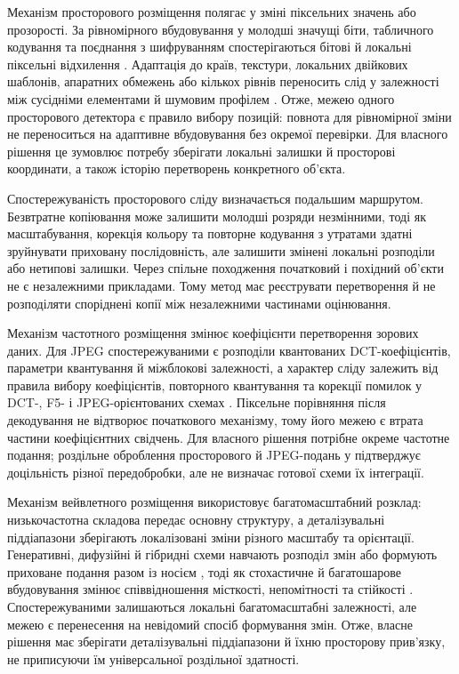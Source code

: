Механізм просторового розміщення полягає у зміні піксельних значень або прозорості. За рівномірного вбудовування у молодші значущі біти, табличного кодування та поєднання з шифруванням спостерігаються бітові й локальні піксельні відхилення \cite{panigrahi2025lsb,hapsari2023lsb,huang2025hybridcoding,ali2024videolsb,sakshi2022lsb,alanzy2023lsb}. Адаптація до країв, текстури, локальних двійкових шаблонів, апаратних обмежень або кількох рівнів переносить слід у залежності між сусідніми елементами й шумовим профілем \cite{hassaballah2021iiot,sultana2023edge,hameed2024medical,harb2023hardware,abuali2024multilevel,wozniak2025twophase,alexan2024stegocrypt}. Отже, межею одного просторового детектора є правило вибору позицій: повнота для рівномірної зміни не переноситься на адаптивне вбудовування без окремої перевірки. Для власного рішення це зумовлює потребу зберігати локальні залишки й просторові координати, а також історію перетворень конкретного об’єкта.

Спостережуваність просторового сліду визначається подальшим маршрутом. Безвтратне копіювання може залишити молодші розряди незмінними, тоді як масштабування, корекція кольору та повторне кодування з утратами здатні зруйнувати приховану послідовність, але залишити змінені локальні розподіли або нетипові залишки. Через спільне походження початковий і похідний об’єкти не є незалежними прикладами. Тому метод має реєструвати перетворення й не розподіляти споріднені копії між незалежними частинами оцінювання.

Механізм частотного розміщення змінює коефіцієнти перетворення зорових даних. Для JPEG спостережуваними є розподіли квантованих DCT-коефіцієнтів, параметри квантування й міжблокові залежності, а характер сліду залежить від правила вибору коефіцієнтів, повторного квантування та корекції помилок у DCT-, F5- і JPEG-орієнтованих схемах \cite{parsafar2024qft,maurya2023quantumdct,wang2023hyperchaotic,pan2022hiddenbit,sushil2024f5,chen2024f5robustness,duan2023jpeg,pan2024jpeg}. Піксельне порівняння після декодування не відтворює початкового механізму, тому його межею є втрата частини коефіцієнтних свідчень. Для власного рішення потрібне окреме частотне подання; роздільне оброблення просторового й JPEG-подань у \cite{he2025twobranch} підтверджує доцільність різної передобробки, але не визначає готової схеми їх інтеграції.

Механізм вейвлетного розміщення використовує багатомасштабний розклад: низькочастотна складова передає основну структуру, а деталізувальні піддіапазони зберігають локалізовані зміни різного масштабу та орієнтації. Генеративні, дифузійні й гібридні схеми навчають розподіл змін або формують приховане подання разом із носієм \cite{yao2024ganwavelet,yuan2022gansecurity,peng2023stegaddpm,ramandi2024vidagan,ma2023adversarial,ahmad2024cnndct}, тоді як стохастичне й багатошарове вбудовування змінює співвідношення місткості, непомітності та стійкості \cite{elhady2024dish,weng2024emd}. Спостережуваними залишаються локальні багатомасштабні залежності, але межею є перенесення на невідомий спосіб формування змін. Отже, власне рішення має зберігати деталізувальні піддіапазони й їхню просторову прив’язку, не приписуючи їм універсальної роздільної здатності.

